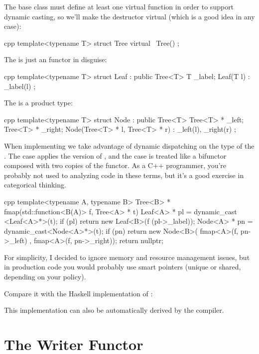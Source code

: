 The base class must define at least one virtual function in order to
support dynamic casting, so we'll make the destructor virtual (which is
a good idea in any case):

\begin{snip}{cpp}
template<typename T>
struct Tree { 
    virtual ~Tree() {}
};
\end{snip}
The  is just an  functor in disguise:

\begin{snip}{cpp}
template<typename T>
struct Leaf : public Tree<T> {
    T _label;
    Leaf(T l) : _label(l) {}
};
\end{snip}
The  is a product type:

\begin{snip}{cpp}
template<typename T>
struct Node : public Tree<T> {
    Tree<T> * _left;
    Tree<T> * _right;
    Node(Tree<T> * l, Tree<T> * r) : _left(l), _right(r) {}
};
\end{snip}
When implementing  we take advantage of dynamic dispatching
on the type of the . The  case applies the
 version of , and the  case
is treated like a bifunctor composed with two copies of the
 functor. As a C++ programmer, you're probably not used to
analyzing code in these terms, but it's a good exercise in categorical
thinking.

\begin{snip}{cpp}
template<typename A, typename B>
Tree<B> * fmap(std::function<B(A)> f, Tree<A> * t) {
    Leaf<A> * pl = dynamic_cast <Leaf<A>*>(t);
    if (pl)
        return new Leaf<B>(f (pl->_label));
    Node<A> * pn = dynamic_cast<Node<A>*>(t);
    if (pn)
        return new Node<B>( fmap<A>(f, pn->_left)
                          , fmap<A>(f, pn->_right));
    return nullptr;
}
\end{snip}
For simplicity, I decided to ignore memory and resource management
issues, but in production code you would probably use smart pointers
(unique or shared, depending on your policy).

Compare it with the Haskell implementation of :

This implementation can also be automatically derived by the compiler.

\section{The Writer Functor}


